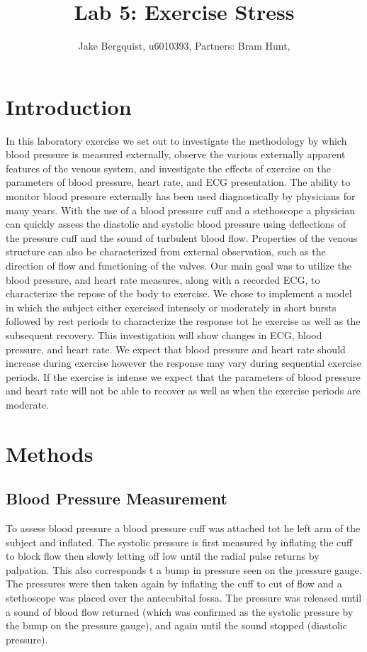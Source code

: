 \documentclass[12pt]{article}
\begin{document}
\title{Lab 5: Exercise Stress}
\author{Jake Bergquist, u6010393, Partners: Bram Hunt,  }
\maketitle

\section{Introduction}
In this laboratory exercise we set out to investigate the methodology by which blood pressure is measured externally, observe the various externally apparent features of the venous system, and investigate the effects of exercise on the parameters of blood pressure, heart rate, and ECG presentation. The ability to monitor blood pressure externally has been used diagnostically by physicians for many years. With the use of a blood pressure cuff and a stethoscope a physician can quickly assess the diastolic and systolic blood pressure using deflections of the pressure cuff and the sound of turbulent blood flow. Properties of the venous structure can also be characterized from external observation, such as the direction of flow and functioning of the valves. Our main goal was to utilize the blood pressure, and heart rate measures, along with a recorded ECG, to characterize the repose of the body to exercise. We chose to implement a model in which the subject either exercised intensely or moderately in short bursts followed by rest periods to characterize the response tot he exercise as well as the subsequent recovery. This investigation will show changes in ECG, blood pressure, and heart rate. We expect that blood pressure and heart rate should increase during exercise however the response may vary during sequential exercise periods. If the exercise is intense we expect that the parameters of blood pressure and heart rate will not be able to recover as well as when the exercise periods are moderate.


\section{Methods}

\subsection{Blood Pressure Measurement}
To assess blood pressure a blood pressure cuff was attached tot he left arm of the subject and inflated. The systolic pressure is first measured by inflating the cuff to block flow then slowly letting off low until the radial pulse returns by palpation. This also corresponds t a bump in pressure seen on the pressure gauge. The pressures were then taken again by inflating the cuff to cut of flow and a stethoscope was placed over the antecubital fossa. The pressure was released until a sound of blood flow returned (which was confirmed as the systolic pressure by the bump on the pressure gauge), and again until the sound stopped (diastolic pressure).
\end{document}

